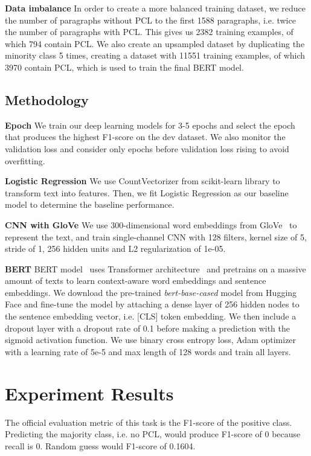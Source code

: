 \documentclass[11pt]{article}
\begin{document}
\textbf{Data imbalance}  In order to create a more balanced training dataset, we reduce the number of paragraphs without PCL to the first 1588 paragraphs, i.e. twice the number of paragraphs with PCL. This gives us 2382 training examples, of which 794 contain PCL. We also create an upsampled dataset by duplicating the minority class 5 times, creating a dataset with 11551 training examples, of which 3970 contain PCL, which is used to train the final BERT model.


\subsection{Methodology}

\textbf{Epoch} We train our deep learning models for 3-5 epochs and select the epoch that produces the highest F1-score on the dev dataset. We also monitor the validation loss and consider only epochs before validation loss rising to avoid overfitting.

\textbf{Logistic Regression}  We use CountVectorizer from scikit-learn library to transform text into features. Then, we fit Logistic Regression as our baseline model to determine the baseline performance. 

\textbf{CNN with GloVe}  We use 300-dimensional word embeddings from GloVe~\cite{pennington2014glove} to represent the text, and train single-channel CNN with 128 filters, kernel size of 5, stride of 1, 256 hidden units and L2 regularization of 1e-05. 

\textbf{BERT}  BERT model~\cite{devlin2018bert} uses Transformer architecture~\cite{vaswani2017attention} and pretrains on a massive amount of texts to learn context-aware word embeddings and sentence embeddings. We download the pre-trained \textit{bert-base-cased} model from Hugging Face and fine-tune the model by attaching a dense layer of 256 hidden nodes to the sentence embedding vector, i.e. [CLS] token embedding. We then include a dropout layer with a dropout rate of 0.1 before making a prediction with the sigmoid activation function. We use binary cross entropy loss, Adam optimizer with a learning rate of 5e-5 and max length of 128 words and train all layers.

\section{Experiment Results}

The official evaluation metric of this task is the F1-score of the positive class. Predicting the majority class, i.e. no PCL, would produce F1-score of 0 because recall is 0. Random guess would F1-score of 0.1604.
\end{document}
